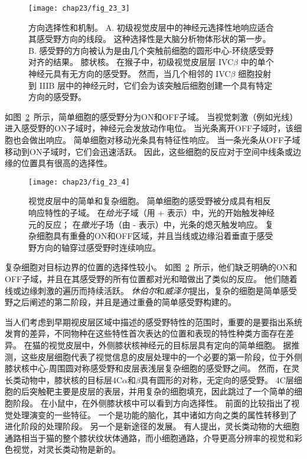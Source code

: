 \begin{figure}[htbp]
	\centering
	\texttt{[image: chap23/fig\_23\_3]}
	\caption{方向选择性和机制。
		A. 初级视觉皮层中的神经元选择性地响应适合其感受野方向的线段。
		这种选择性是大脑分析物体形状的第一步\cite{hubel1968receptive}。
		B. 感受野的方向被认为是由几个突触前细胞的圆形中心-环绕感受野对齐的结果。 
		膝状核。
		在猴子中，初级视觉皮层层 IVC$\beta$ 中的单个神经元具有无方向的感受野。
		然而，当几个相邻的 IVC$\beta$ 细胞投射到 IIIB 层中的神经元时，它们会为该突触后细胞创建一个具有特定方向的感受野。}
	\label{fig:23_3}
\end{figure}


如图~\ref{fig:23_4}~所示，简单细胞的感受野分为ON和OFF子域。
当视觉刺激（例如光线）进入感受野的ON子域时，神经元会发放动作电位。
当光条离开OFF子域时，该细胞也会做出响应。
简单细胞对移动光条具有特征性响应。
当一条光条从OFF子域移动到ON子域时，它们会迅速活跃。
因此，这些细胞的反应对于空间中线条或边缘的位置具有很高的选择性。


\begin{figure}[htbp]
	\centering
	\texttt{[image: chap23/fig\_23\_4]}
	\caption{视觉皮层中的简单和复杂细胞。
		简单细胞的感受野被分成具有相反响应特性的子域。
		在\textit{给光}子域（用 + 表示）中，光的开始触发神经元的反应；
		在\textit{撤光}子场（由 - 表示）中，光条的熄灭触发响应。
		复杂细胞具有重叠的ON和OFF区域，并且当线或边缘沿着垂直于感受野方向的轴穿过感受野时连续响应。}
	\label{fig:23_4}
\end{figure}


复杂细胞对目标边界的位置的选择性较小。
如图~\ref{fig:23_4}~所示，他们缺乏明确的ON和OFF子域，并且在其感受野的所有位置都对光和暗做出了类似的反应。
他们随着线或边缘刺激的遍历而持续活跃。
\textit{休伯尔}和\textit{威泽尔}提出，复杂的细胞是简单感受野之后阐述的第二阶段，并且是通过重叠的简单感受野构建的。


当人们考虑到早期视皮层区域中描述的感受野特性的范围时，重要的是要指出系统发育的差异，不同物种在这些特性首次表达的位置和表现的特性种类方面存在差异。
在猫的视觉皮层中，外侧膝状核神经元的目标层具有定向的简单细胞。
据推测，这些皮层细胞代表了视觉信息的皮层处理中的一个必要的第一阶段，位于外侧膝状核中心-周围圆对称感受野和皮层表浅层复杂细胞的感受野之间。
然而，在灵长类动物中，膝状核的目标层4C$\alpha$和$\beta$具有圆形的对称，无定向的感受野。
4C层细胞的后突触靶主要是皮层的表层，并用复杂的细胞填充，因此跳过了一个简单的细胞阶段。
在小鼠中，在外侧膝状核中可以看到方向选择性。
前面的比较指出了视觉处理演变的一些特征。
一个是功能的脑化，其中诸如方向之类的属性转移到了进化阶段的处理阶段。
另一个是新途径的发展。
有人提出，灵长类动物的大细胞通路相当于猫的整个膝状纹状体通路，而小细胞通路，介导更高分辨率的视觉和彩色视觉，对灵长类动物是新的。


